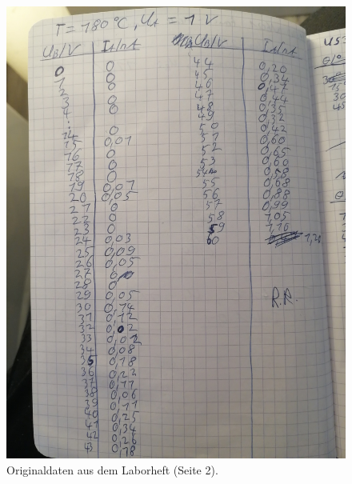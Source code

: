\begin{figure}
    \centering
    \includegraphics[width=\textwidth]{content/data/daten2.jpg}
    \caption{Originaldaten aus dem Laborheft (Seite 2).}
\end{figure}